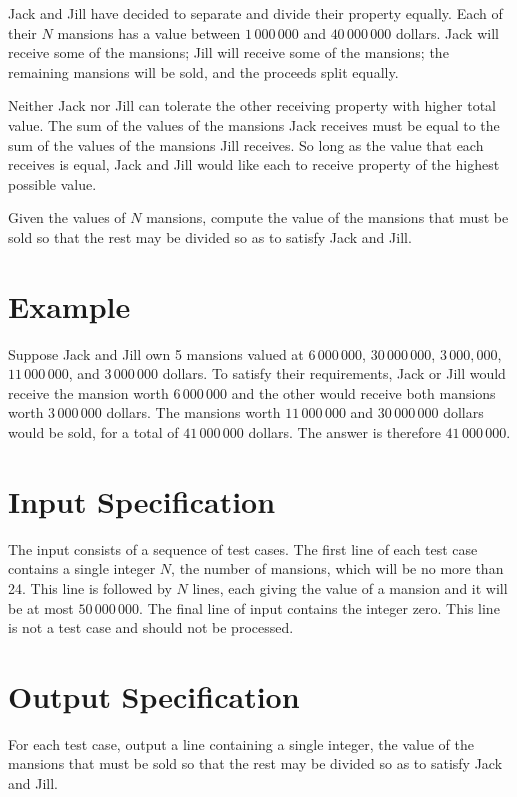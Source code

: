 
Jack and Jill have decided to separate and divide their property equally. Each of their $N$ mansions
has a value between $1\,000\,000$ and $40\,000\,000$ dollars. Jack will receive some of the
mansions; Jill will receive some of the mansions; the remaining mansions will be sold, and the
proceeds split equally.

Neither Jack nor Jill can tolerate the other receiving property with higher total value. The sum of
the values of the mansions Jack receives must be equal to the sum of the values of the mansions Jill
receives.  So long as the value that each receives is equal, Jack and Jill would like each to
receive property of the highest possible value.

Given the values of $N$ mansions, compute the value of the mansions that must be sold so that the
rest may be divided so as to satisfy Jack and Jill.

\section*{Example}
Suppose Jack and Jill own 5 mansions valued at $6\,000\,000$, $30\,000\,000$, $3\,000,000$,
$11\,000\,000$, and $3\,000\,000$ dollars.  To satisfy their requirements, Jack or Jill would
receive the mansion worth $6\,000\,000$ and the other would receive both mansions worth
$3\,000\,000$ dollars. The mansions worth $11\,000\,000$ and $30\,000\,000$ dollars would be sold,
for a total of $41\,000\,000$ dollars.  The answer is therefore $41\,000\,000$.

\section*{Input Specification}
The input consists of a sequence of test cases. The first line of each test case contains a single
integer $N$, the number of mansions, which will be no more than 24. This line is followed by
$N$ lines, each giving the value of a mansion and it will be at most $50\,000\,000$. The final line of input contains the integer
zero. This line is not a test case and should not be processed.

\section*{Output Specification}
For each test case, output a line containing a single integer, the value of the mansions that must
be sold so that the rest may be divided so as to satisfy Jack and Jill.
